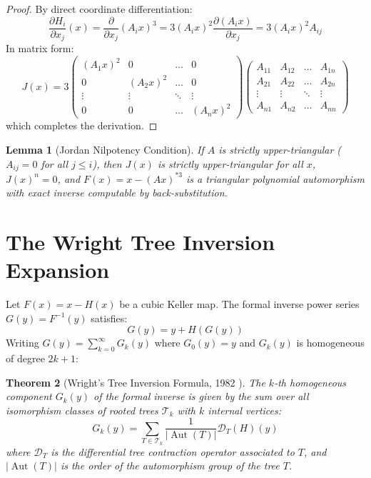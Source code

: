 \documentclass[11pt,a4paper]{article}
\newtheorem{theorem}{Theorem}[section]
\newtheorem{lemma}[theorem]{Lemma}
\theoremstyle{definition}
\begin{document}
\begin{proof}
By direct coordinate differentiation:
\[ \frac{\partial H_i}{\partial x_j}(x) = \frac{\partial}{\partial x_j} (A_i x)^3 = 3 (A_i x)^2 \frac{\partial (A_i x)}{\partial x_j} = 3 (A_i x)^2 A_{ij} \]
In matrix form:
\[ J(x) = 3 \begin{pmatrix} (A_1 x)^2 & 0 & \dots & 0 \\ 0 & (A_2 x)^2 & \dots & 0 \\ \vdots & \vdots & \ddots & \vdots \\ 0 & 0 & \dots & (A_n x)^2 \end{pmatrix} \begin{pmatrix} A_{11} & A_{12} & \dots & A_{1n} \\ A_{21} & A_{22} & \dots & A_{2n} \\ \vdots & \vdots & \ddots & \vdots \\ A_{n1} & A_{n2} & \dots & A_{nn} \end{pmatrix} \]
which completes the derivation.
\end{proof}

\begin{lemma}[Jordan Nilpotency Condition]\label{lem:jordan_nilpotent}
If $A$ is strictly upper-triangular ($A_{ij} = 0$ for all $j \le i$), then $J(x)$ is strictly upper-triangular for all $x$, $J(x)^n = 0$, and $F(x) = x - (Ax)^{*3}$ is a triangular polynomial automorphism with exact inverse computable by back-substitution.
\end{lemma}

\section{The Wright Tree Inversion Expansion}

Let $F(x) = x - H(x)$ be a cubic Keller map. The formal inverse power series $G(y) = F^{-1}(y)$ satisfies:
\begin{equation}\label{eq:inverse_functional_eq}
G(y) = y + H(G(y))
\end{equation}
Writing $G(y) = \sum_{k=0}^\infty G_k(y)$ where $G_0(y) = y$ and $G_k(y)$ is homogeneous of degree $2k+1$:

\begin{theorem}[Wright's Tree Inversion Formula, 1982 \cite{wright1982, bass1982}]\label{thm:wright_tree}
The $k$-th homogeneous component $G_k(y)$ of the formal inverse is given by the sum over all isomorphism classes of rooted trees $\mathcal{T}_k$ with $k$ internal vertices:
\begin{equation}\label{eq:tree_sum}
G_k(y) = \sum_{T \in \mathcal{T}_k} \frac{1}{|\operatorname{Aut}(T)|} \mathcal{D}_T(H)(y)
\end{equation}
where $\mathcal{D}_T$ is the differential tree contraction operator associated to $T$, and $|\operatorname{Aut}(T)|$ is the order of the automorphism group of the tree $T$.
\end{theorem}
\end{document}
